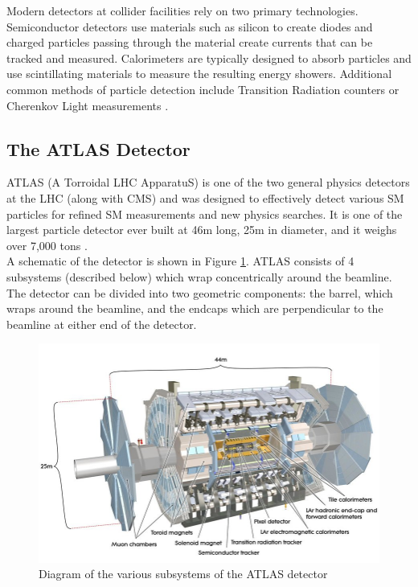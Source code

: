 Modern detectors at collider facilities rely on two primary technologies. Semiconductor detectors use materials such as silicon to create diodes and charged particles passing through the material create currents that can be tracked and measured. Calorimeters are typically designed to absorb particles and use scintillating materials to measure the resulting energy showers. Additional common methods of particle detection include Transition Radiation counters or Cherenkov Light measurements \cite{detector_physics}.

\subsection{The ATLAS Detector}
ATLAS (A Torroidal LHC ApparatuS) is one of the two general physics detectors at the LHC (along with CMS) and was designed to effectively detect various SM particles for refined SM measurements and new physics searches. It is one of the largest particle detector ever built at 46m long, 25m in diameter, and it weighs over 7,000 tons \cite{tdr1}\cite{tdr2}. \\

A schematic of the detector is shown in Figure \ref{fig:atlas_schem}. ATLAS consists of 4 subsystems (described below) which wrap concentrically around the beamline. The detector can be divided into two geometric components: the barrel, which wraps around the beamline, and the endcaps which are perpendicular to the beamline at either end of the detector.\\

\begin{figure}[h]
    \centering
    \includegraphics[width=4.5in]{figures/chapter2/atlas_schem.png}
    \caption{Diagram of the various subsystems of the ATLAS detector \cite{atlas}}
    \label{fig:atlas_schem}
\end{figure}

